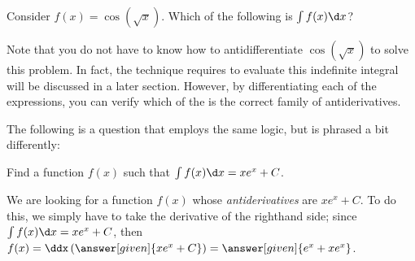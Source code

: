\documentclass[nooutcomes]{ximera}
\begin{document}
\begin{question}
  Consider $f(x) = \cos(\sqrt{x})$. Which of the following is $\int f(x) \d x$?  
  \begin{selectAll}
  \end{selectAll}
  
  \begin{feedback}
  Note that you do not have to know how to antidifferentiate $\cos\left(\sqrt{x}\right)$ to solve this problem.  In fact, the technique requires to evaluate this indefinite integral will be discussed in a later section. However, by differentiating each of the expressions, you can verify which of the is the correct family of antiderivatives.
  \end{feedback}
\end{question}

The following is a question that employs the same logic, but is phrased a bit differently:

\begin{example}
 Find a function $f(x)$ such that $\int f(x) \d x = xe^x +C$.
  
  \begin{explanation}
    We are looking for a function $f(x)$ whose \emph{antiderivatives} are $xe^x +C$.  To do this, we simply have to take the derivative of the righthand side; since $\int f(x) \d x =xe^x +C$, then $f(x) = \ddx\left(\answer[given]{xe^x +C}\right) =\answer[given]{e^x + xe^x}$.
    
    \end{explanation}
\end{example}



\end{document}
